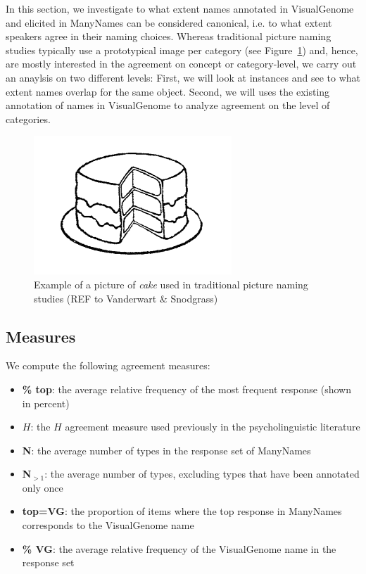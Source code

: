 In this section, we investigate to what extent names annotated in VisualGenome and elicited in ManyNames can be considered canonical, i.e. to what extent speakers agree in their naming choices.
Whereas traditional picture naming studies typically use a prototypical image per category (see Figure~\ref{fig:picture_naming}) and, hence, are mostly interested in the agreement on concept or category-level, we carry out an anaylsis on two different levels: First, we will look at instances and see to what extent names overlap for the same object. Second, we will uses the existing annotation of names in VisualGenome to analyze agreement on the level of categories.
\begin{figure}[t]
	\centering
	\includegraphics[scale=.5]{figures/snodgrass_vanderwart_cake_042.png}
	\caption{Example of a picture of \textsl{cake} used in traditional picture naming studies (REF to Vanderwart \& Snodgrass) \label{fig:picture_naming}}
\end{figure}


\subsection{Measures}

We compute the following agreement measures:

\begin{itemize}
\item \textbf{\% top}: the average relative frequency of the most frequent response (shown in percent)
\item \textbf{$H$}: the $H$ agreement measure used previously in the psycholinguistic literature
\item \textbf{N}: the average number of types in the response set of ManyNames
\item \textbf{N$_{>1}$}: the average number of types, excluding types that have been annotated only once
\item \textbf{top=VG}: the proportion of items where the top response in ManyNames corresponds to the VisualGenome name
\item \textbf{\% VG}: the average relative frequency of the VisualGenome name in the response set

\end{itemize}

